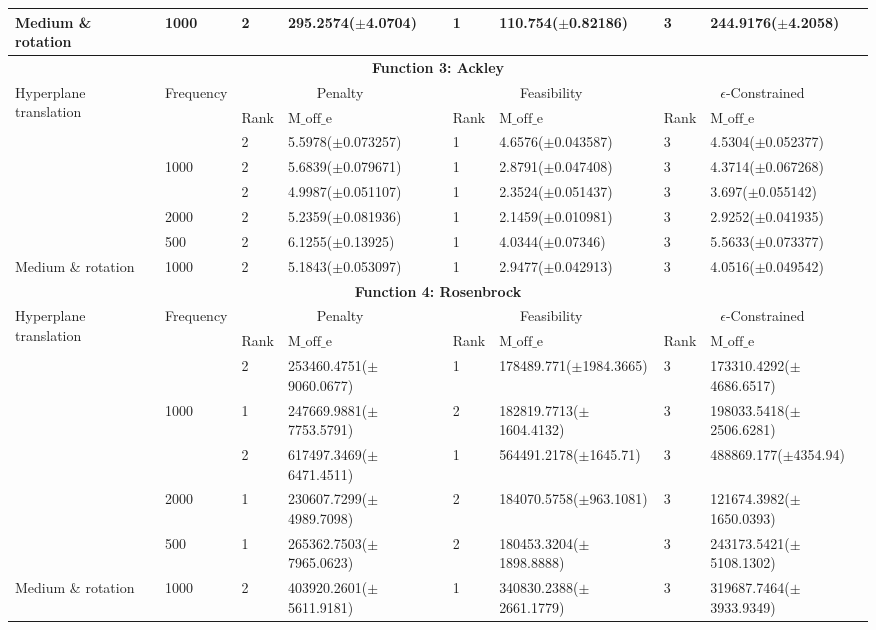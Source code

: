 \documentclass[conference]{IEEEtran}
\begin{document}
\begin{table}[t]
{\begin{tabular}{ll|llllll}
     Medium \& rotation&1000&2&295.2574($\pm$4.0704)&1&110.754($\pm$0.82186)&3&244.9176($\pm$4.2058)\\
     \hline\multicolumn{8}{c}{\textbf{Function 3: Ackley}}\\\hline \multirow{2}{*}{Hyperplane translation}&\multirow{2}{*}{Frequency}&
     \multicolumn{2}{c}{Penalty}&\multicolumn{2}{c}{Feasibility}&\multicolumn{2}{c}{$\epsilon$-Constrained}\\&&
     Rank&$\text{M\_off\_e}$&Rank&$\text{M\_off\_e}$&Rank&$\text{M\_off\_e}$\\\hline
     \multirow{3}{*}{}Small&&2&5.5978($\pm$0.073257)&1&4.6576($\pm$0.043587)&3&4.5304($\pm$0.052377)\\
     Medium&1000&2&5.6839($\pm$0.079671)&1&2.8791($\pm$0.047408)&3&4.3714($\pm$0.067268)\\
     Large&&2&4.9987($\pm$0.051107)&1&2.3524($\pm$0.051437)&3&3.697($\pm$0.055142)\\\hdashline
     \multirow{2}{*}{Medium}&2000&2&5.2359($\pm$0.081936)&1&2.1459($\pm$0.010981)&3&2.9252($\pm$0.041935)\\
     &500&2&6.1255($\pm$0.13925)&1&4.0344($\pm$0.07346)&3&5.5633($\pm$0.073377)\\\hdashline
     Medium \& rotation&1000&2&5.1843($\pm$0.053097)&1&2.9477($\pm$0.042913)&3&4.0516($\pm$0.049542)\\
     \hline\multicolumn{8}{c}{\textbf{Function 4: Rosenbrock}}\\\hline \multirow{2}{*}{Hyperplane translation}&\multirow{2}{*}{Frequency}&
     \multicolumn{2}{c}{Penalty}&\multicolumn{2}{c}{Feasibility}&\multicolumn{2}{c}{$\epsilon$-Constrained}\\&&
     Rank&$\text{M\_off\_e}$&Rank&$\text{M\_off\_e}$&Rank&$\text{M\_off\_e}$\\\hline
     \multirow{3}{*}{}Small&&2&253460.4751($\pm$9060.0677)&1&178489.771($\pm$1984.3665)&3&173310.4292($\pm$4686.6517)\\
     Medium&1000&1&247669.9881($\pm$7753.5791)&2&182819.7713($\pm$1604.4132)&3&198033.5418($\pm$2506.6281)\\
     Large&&2&617497.3469($\pm$6471.4511)&1&564491.2178($\pm$1645.71)&3&488869.177($\pm$4354.94)\\\hdashline
     \multirow{2}{*}{Medium}&2000&1&230607.7299($\pm$4989.7098)&2&184070.5758($\pm$963.1081)&3&121674.3982($\pm$1650.0393)\\
     &500&1&265362.7503($\pm$7965.0623)&2&180453.3204($\pm$1898.8888)&3&243173.5421($\pm$5108.1302)\\\hdashline
     Medium \& rotation&1000&2&403920.2601($\pm$5611.9181)&1&340830.2388($\pm$2661.1779)&3&319687.7464($\pm$3933.9349)\\
     \hline
\end{tabular}
}
\end{table}
\end{document}
